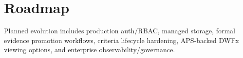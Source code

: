 \section{Roadmap}
Planned evolution includes production auth/RBAC, managed storage, formal evidence promotion workflows, criteria lifecycle hardening, APS-backed DWFx viewing options, and enterprise observability/governance.

